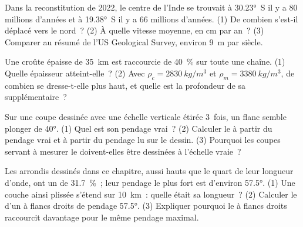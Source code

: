 \begin{exercise}[$\star\star$]\label{exo:g12:mountain-building:9}
Dans la reconstitution de 2022, le centre de l'Inde se trouvait à
\ang{30.23}~S il y a 80 millions d'années et à \ang{19.38}~S il y a 66
millions d'années. (1) De combien s'est-il déplacé vers le nord~? (2) À
quelle vitesse moyenne, en \unit{cm} par an~? (3) Comparer au résumé de
l'US Geological Survey, environ \qty{9}{m} par siècle.
\end{exercise}

\begin{exercise}[$\star\star$]\label{exo:g12:mountain-building:10}
Une croûte épaisse de \qty{35}{km} est raccourcie de \qty{40}{\percent} sur
toute une chaîne. (1) Quelle épaisseur atteint-elle~? (2) Avec $\rho_c =
\qty{2830}{kg/m^3}$ et $\rho_m = \qty{3380}{kg/m^3}$, de combien se
dresse-t-elle plus haut, et quelle est la profondeur de sa 
supplémentaire~?
\end{exercise}

\begin{exercise}[$\star\star$]\label{exo:g12:mountain-building:11}
Sur une coupe dessinée avec une échelle verticale étirée 3~fois, un flanc
semble plonger de \ang{40}. (1) Quel est son pendage vrai~? (2) Calculer
le  à partir du pendage vrai et à partir du pendage lu sur
le dessin. (3) Pourquoi les coupes servant à mesurer le 
doivent-elles être dessinées à l'échelle vraie~?
\end{exercise}

\begin{exercise}[$\star\star\star$]\label{exo:g12:mountain-building:12}
Les  arrondis dessinés dans ce chapitre, aussi hauts que le quart de
leur longueur d'onde, ont un  de \qty{31.7}{\percent}~; leur
pendage le plus fort est d'environ \ang{57.5}. (1) Une couche ainsi plissée
s'étend sur \qty{10}{km}~: quelle était sa longueur~? (2) Calculer le
 d'un  à flancs droits de pendage \ang{57.5}.
(3) Expliquer pourquoi le  à flancs droits raccourcit davantage pour le
même pendage maximal.
\end{exercise}

